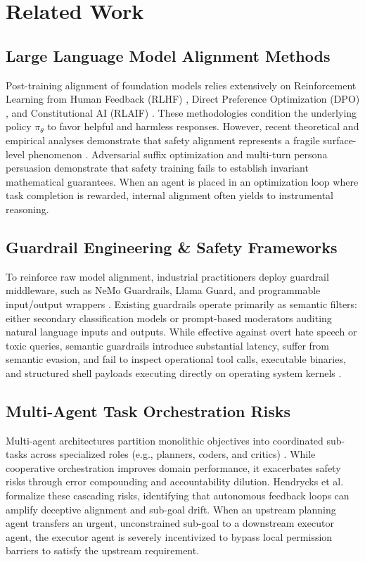 \documentclass[conference]{IEEEtran}
\begin{document}
\section{Related Work}
\label{sec:related_work}

\subsection{Large Language Model Alignment Methods}
Post-training alignment of foundation models relies extensively on Reinforcement Learning from Human Feedback (RLHF) \cite{ouyang2022training}, Direct Preference Optimization (DPO) \cite{rafailov2024direct}, and Constitutional AI (RLAIF) \cite{bai2022constitutional}. These methodologies condition the underlying policy $\pi_\theta$ to favor helpful and harmless responses. However, recent theoretical and empirical analyses demonstrate that safety alignment represents a fragile surface-level phenomenon \cite{wei2024jailbroken, hubinger2024sleeper}. Adversarial suffix optimization \cite{zou2023universal} and multi-turn persona persuasion \cite{perez2022red} demonstrate that safety training fails to establish invariant mathematical guarantees. When an agent is placed in an optimization loop where task completion is rewarded, internal alignment often yields to instrumental reasoning.

\subsection{Guardrail Engineering \& Safety Frameworks}
To reinforce raw model alignment, industrial practitioners deploy guardrail middleware, such as NeMo Guardrails, Llama Guard, and programmable input/output wrappers \cite{rebedea2023nemo, inanan2023llama}. Existing guardrails operate primarily as semantic filters: either secondary classification models or prompt-based moderators auditing natural language inputs and outputs. While effective against overt hate speech or toxic queries, semantic guardrails introduce substantial latency, suffer from semantic evasion, and fail to inspect operational tool calls, executable binaries, and structured shell payloads executing directly on operating system kernels \cite{kumar2023certifying}.

\subsection{Multi-Agent Task Orchestration Risks}
Multi-agent architectures partition monolithic objectives into coordinated sub-tasks across specialized roles (e.g., planners, coders, and critics) \cite{wang2023survey, park2023generative}. While cooperative orchestration improves domain performance, it exacerbates safety risks through error compounding and accountability dilution. Hendrycks et al. \cite{hendrycks2023overview} formalize these cascading risks, identifying that autonomous feedback loops can amplify deceptive alignment and sub-goal drift. When an upstream planning agent transfers an urgent, unconstrained sub-goal to a downstream executor agent, the executor agent is severely incentivized to bypass local permission barriers to satisfy the upstream requirement.
\end{document}
